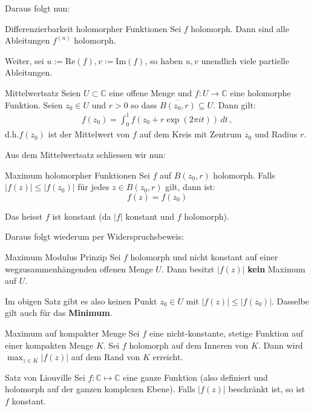 \documentclass[a4paper,10pt]{article}
\def\C{\mathbb{C}}
\def\Re{\text{Re}}
\def\Im{\text{Im}}
\begin{document}
Daraus folgt nun:

\begin{subbox}{Differenzierbarkeit holomorpher Funktionen}
  Sei $f$ holomorph. Dann sind alle Ableitungen $f^{(n)}$ holomorph.

  Weiter, sei $u := \Re(f), v := \Im(f)$, so haben $u, v$ unendlich viele partielle Ableitungen.
\end{subbox}

\begin{mainbox}{Mittelwertsatz}
  Seien \(U\subset\mathbb{C}\) eine offene Menge und \(f \colon U \to \mathbb{C}\) eine holomorphe Funktion. Seien \(z_0 \in U\) und \(r > 0\) so dass \(\overline{B(z_0,r)} \subseteq U\). Dann gilt:
  \begin{align*} f(z_0) = \int_0^1 f(z_0 + r \exp(2 \pi i t))\, dt\,, \end{align*} d.h.\(f(z_0)\) ist der Mittelwert von \(f\) auf dem Kreis mit Zentrum \(z_0\) und Radius \(r\).
\end{mainbox}

Aus dem Mittelwertsatz schliessen wir nun:

\begin{subbox}{Maximum holomorpher Funktionen}
  Sei $f$ auf $B(z_0, r)$ holomorph. Falls $|f(z)| \leq |f(z_0)|$ für jedes $z \in B(z_0, r)$ gilt, dann ist:
  $$
    f(z) = f(z_0)
  $$

  Das heisst $f$ ist konstant (da $|f|$ konstant und $f$ holomorph).
\end{subbox}

Daraus folgt wiederum per Widerspruchsbeweis:

\begin{mainbox}{Maximum Modulus Prinzip}
  Sei $f$ holomorph und nicht konstant auf einer wegzusammenhängenden offenen Menge $U$. Dann besitzt $|f(z)|$ \textbf{kein} Maximum auf $U$.
\end{mainbox}

Im obigen Satz gibt es also keinen Punkt $z_0 \in U$ mit $|f(z)| \leq |f(z_0)|$. Dasselbe gilt auch für das \textbf{Minimum}.

\begin{subbox}{Maximum auf kompakter Menge}
  Sei $f$ eine nicht-konstante, stetige Funktion auf  einer kompakten Menge $K$. Sei $f$ holomorph auf dem Inneren von $K$. Dann wird $\max_{z \in K} |f(z)|$ auf dem Rand von $K$ erreicht.
\end{subbox}

\begin{mainbox}{Satz von Liouville}
  Sei $f: \C \mapsto \C$ eine ganze Funktion (also definiert und holomorph auf der ganzen komplexen Ebene). Falls $|f(z)|$ beschränkt ist, so ist $f$ konstant.
\end{mainbox}
\end{document}
